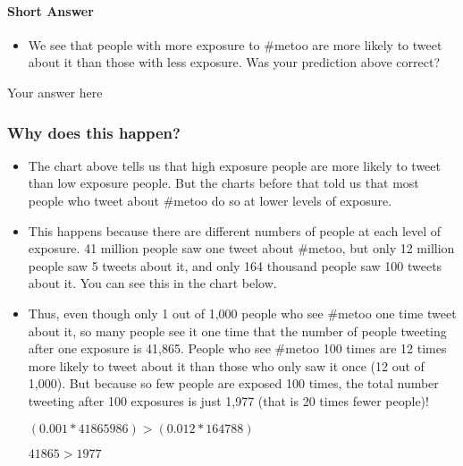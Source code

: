 \documentclass[11pt]{article}
\providecommand{\tightlist}{%
      \setlength{\itemsep}{0pt}\setlength{\parskip}{0pt}}
\begin{document}
    \hypertarget{short-answer}{%
\paragraph{Short Answer}\label{short-answer}}

\begin{itemize}
\tightlist
\item
  We see that people with more exposure to \#metoo are more likely to
  tweet about it than those with less exposure. Was your prediction
  above correct?
\end{itemize}

    Your answer here

    \hypertarget{why-does-this-happen}{%
\subsubsection{Why does this happen?}\label{why-does-this-happen}}

\begin{itemize}
\item
  The chart above tells us that high exposure people are more likely to
  tweet than low exposure people. But the charts before that told us
  that most people who tweet about \#metoo do so at lower levels of
  exposure.
\item
  This happens because there are different numbers of people at each
  level of exposure. 41 million people saw one tweet about \#metoo, but
  only 12 million people saw 5 tweets about it, and only 164 thousand
  people saw 100 tweets about it. You can see this in the chart below.
\item
  Thus, even though only 1 out of 1,000 people who see \#metoo one time
  tweet about it, so many people see it one time that the number of
  people tweeting after one exposure is 41,865. People who see \#metoo
  100 times are 12 times more likely to tweet about it than those who
  only saw it once (12 out of 1,000). But because so few people are
  exposed 100 times, the total number tweeting after 100 exposures is
  just 1,977 (that is 20 times fewer people)!

  \((0.001*41865986) > (0.012*164788)\)

  \(41865 > 1977\)
\end{itemize}
\end{document}
